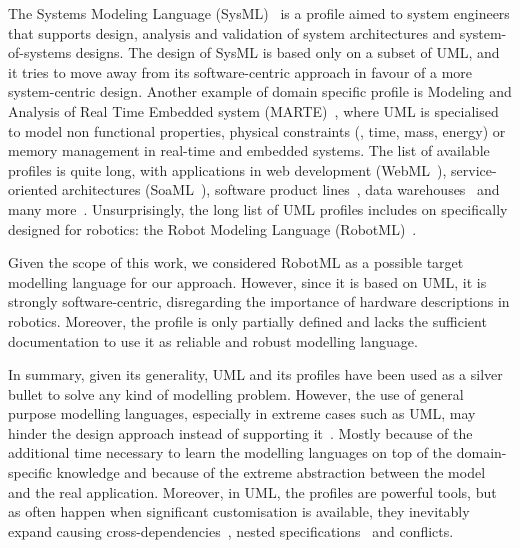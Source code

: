 The Systems Modeling Language (SysML)~\cite{friedenthal2014practical} is a profile aimed to system engineers that supports design, analysis and validation of system architectures and system-of-systems designs. The design of SysML is based only on a subset of UML, and it tries to move away from its software-centric approach in favour of a more system-centric design. Another example of domain specific profile is Modeling and Analysis of Real Time Embedded system (MARTE)~\cite{faugere2007marte}, where UML is specialised to model non functional properties, physical constraints (\eg, time, mass, energy) or memory management in real-time and embedded systems. The list of available profiles is quite long, with applications in web development (WebML~\cite{ceri2000web}), service-oriented architectures (SoaML~\cite{elvesaeter2011model}), software product lines~\cite{ziadi2003towards}, data warehouses~\cite{lujan2006uml} and many more~\cite{fontoura2000uml, aldawud2001uml}. Unsurprisingly, the long list of UML profiles includes on specifically designed for robotics: the Robot Modeling Language (RobotML)~\cite{dhouib2012robotml}.

Given the scope of this work, we considered RobotML as a possible target modelling language for our approach. However, since it is based on UML, it is strongly software-centric, disregarding the importance of hardware descriptions in robotics. Moreover, the profile is only partially defined and lacks the sufficient documentation to use it as reliable and robust modelling language.

In summary, given its generality, UML and its profiles have been used as a silver bullet to solve any kind of modelling problem. However, the use of general purpose modelling languages, especially in extreme cases such as UML, may hinder the design approach instead of supporting it~\cite{simons199930, bonnet2016not}. Mostly because of the additional time necessary to learn the modelling languages on top of the domain-specific knowledge and because of the extreme abstraction between the model and the real application. Moreover, in UML, the profiles are powerful tools, but as often happen when significant customisation is available, they inevitably expand causing cross-dependencies~\cite{espinoza2009challenges}, nested specifications~\cite{faugere2007marte} and conflicts.

